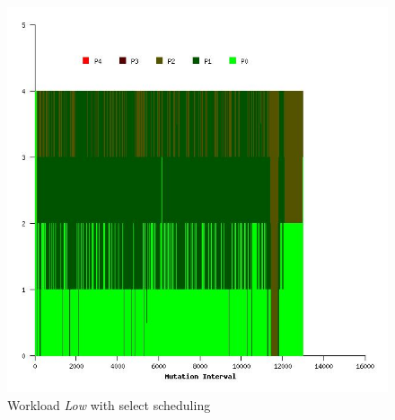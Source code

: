 \begin{figure}
  \begin{center}
    \includegraphics[scale=0.4]{figures/mutation_timeline_figures/mut_sel_t0/Low/125_4.jpeg}%
    \caption{Workload \textit{Low} with select scheduling}
    \label{fig:wrk_low_select}
  \end{center}
\end{figure}

